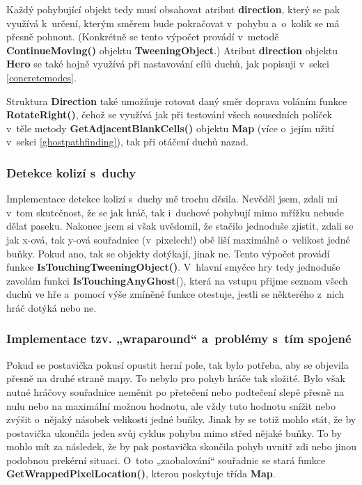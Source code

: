 \documentclass[a4]{article}
\begin{document}
Každý pohybující objekt tedy musí obsahovat atribut \textbf{direction}, který se pak využívá k~určení, kterým směrem bude pokračovat v~pohybu a~o~kolik se má přesně pohnout. (Konkrétně se tento výpočet provádí v~metodě \textbf{ContinueMoving()} objektu \textbf{TweeningObject}.) Atribut \textbf{direction} objektu \textbf{Hero} se také hojně využívá při nastavování cílů duchů, jak popisuji v~sekci \ref{concretemodes}.

Struktura \textbf{Direction} také umožňuje rotovat daný směr doprava voláním funkce \textbf{RotateRight()}, čehož se využívá jak při testování všech sousedních políček v~těle metody \textbf{GetAdjacentBlankCells()} objektu \textbf{Map} (více o~jejím užití v~sekci \ref{ghostpathfinding}), tak při otáčení duchů nazad.

\subsubsection{Detekce kolizí s~duchy} \label{collisiondetection}
Implementace detekce kolizí s~duchy mě trochu děsila. Nevěděl jsem, zdali mi v~tom skutečnost, že se jak hráč, tak i~duchové pohybují mimo mřížku nebude dělat paseku. Nakonec jsem si však uvědomil, že stačilo jednoduše zjistit, zdali se jak x-ová, tak y-ová souřadnice (v~pixelech!) obě liší maximálně o~velikost jedné buňky. Pokud ano, tak se objekty dotýkají, jinak ne. Tento výpočet provádí funkce \textbf{IsTouchingTweeningObject()}. V~hlavní smyčce hry tedy jednoduše zavolám funkci \textbf{IsTouchingAnyGhost}(), která na vstupu přijme seznam všech duchů ve hře a~pomocí výše zmíněné funkce otestuje, jestli se některého z~nich hráč dotýká nebo ne.

\subsubsection{Implementace tzv. „wraparound“ a~problémy s~tím spojené} \label{wraparound}
Pokud se postavička pokusí opustit herní pole, tak bylo potřeba, aby se objevila přesně na druhé straně mapy. To nebylo pro pohyb hráče tak složité. Bylo však nutné hráčovy souřadnice neměnit po přetečení nebo podtečení slepě přesně na nulu nebo na maximální možnou hodnotu, ale vždy tuto hodnotu snížit nebo zvýšit o~nějaký násobek velikosti jedné buňky. Jinak by se totiž mohlo stát, že by postavička ukončila jeden svůj cyklus pohybu mimo střed nějaké buňky. To by mohlo mít za následek, že by pak postavička skončila pohyb uvnitř zdi nebo jinou podobnou prekérní situaci. O~toto „zaobalování“ souřadnic se stará funkce \textbf{GetWrappedPixelLocation()}, kterou poskytuje třída \textbf{Map}.
\end{document}
